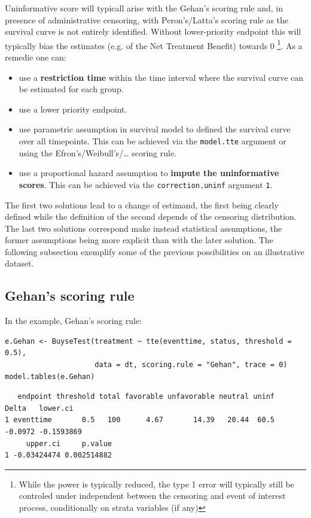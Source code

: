 \documentclass[12pt]{article}
\begin{document}
Uninformative score will typicall arise with the Gehan's scoring rule
  and, in presence of administrative censoring, with Peron's/Latta's
  scoring rule as the survival curve is not entirely
  identified. Without lower-priority endpoint this will typically bias
  the estimates (e.g. of the Net Treatment Benefit) towards 0
  \footnote{While the power is typically reduced, the type 1 error will
  typically still be controled under independent between the censoring
  and event of interest process, conditionally on strata variables (if
  any)}. As a remedie one can:
\begin{itemize}
\item use a \textbf{restriction time} within the time interval where the survival
curve can be estimated for each group.
\item use a lower priority endpoint.
\item use parametric assumption in survival model to defined the survival
curve over all timepoints. This can be achieved via the \texttt{model.tte}
argument or using the Efron's/Weibull's/\ldots{} scoring rule.
\item use a proportional hazard assumption to \textbf{impute the uninformative
scores}. This can be achieved via the \texttt{correction.uninf} argument
\texttt{1}.
\end{itemize}

The first two solutions lead to a change of estimand, the first being
clearly defined while the definition of the second depends of the
censoring distribution. The last two solutions correspond make instead
statistical assumptions, the former assumptions being more explicit
than with the later solution. The following subsection exemplify some
of the previous possibilities on an illustrative dataset.

\subsection{Gehan's scoring rule}
\label{sec:org96d0e8d}

In the example, Gehan's scoring rule:
\lstset{language=r,label= ,caption= ,captionpos=b,numbers=none}
\begin{lstlisting}
e.Gehan <- BuyseTest(treatment ~ tte(eventtime, status, threshold = 0.5),
                     data = dt, scoring.rule = "Gehan", trace = 0)
model.tables(e.Gehan)
\end{lstlisting}

\begin{verbatim}
   endpoint threshold total favorable unfavorable neutral uninf   Delta   lower.ci
1 eventtime       0.5   100      4.67       14.39   20.44  60.5 -0.0972 -0.1593869
     upper.ci     p.value
1 -0.03424474 0.002514882
\end{verbatim}
\end{document}
